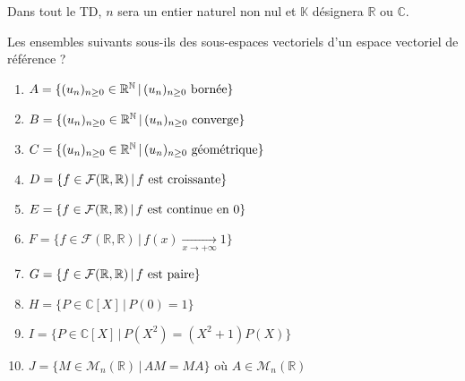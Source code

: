 \documentclass[a4paper,10pt]{report}
\begin{document}
\everymath{\displaystyle}


\begin{center}
\end{center}

\bigskip

\noindent Dans tout le TD, $n$ sera un entier naturel non nul et $\mathbb{K}$ désignera $\mathbb{R}$ ou $\mathbb{C}$.

\medskip


\begin{Exercice}{} Les ensembles suivants sous-ils des sous-espaces vectoriels d'un espace vectoriel de référence ?

\begin{multicols}{2}
\begin{small}
\begin{enumerate}
\item $A = \lbrace (u_n)_{n \geq 0} \in \mathbb{R}^{\mathbb{N}} \, \vert \, (u_n)_{n \geq 0} \hbox{ bornée} \rbrace $
\item $B = \lbrace (u_n)_{n \geq 0} \in \mathbb{R}^{\mathbb{N}} \, \vert \, (u_n)_{n \geq 0} \hbox{ converge} \rbrace $
\item $C = \lbrace (u_n)_{n \geq 0} \in \mathbb{R}^{\mathbb{N}} \, \vert \, (u_n)_{n \geq 0} \hbox{ géométrique} \rbrace $
\item $D = \lbrace f \in \mathcal{F}(\mathbb{R}, \mathbb{R}) \, \vert \, f \hbox{ est croissante} \rbrace$
\item $E = \lbrace f \in \mathcal{F}(\mathbb{R}, \mathbb{R}) \, \vert \, f \hbox{ est continue en 0} \rbrace$
\columnbreak
\item $F = \lbrace f \in \mathcal{F}(\mathbb{R}, \mathbb{R}) \, \vert \, f(x) \underset{ x \rightarrow + \infty}{\rightarrow} 1 \rbrace$
\item $G= \lbrace f \in \mathcal{F}(\mathbb{R}, \mathbb{R}) \, \vert \, f \hbox{ est paire} \rbrace$
\item $H= \lbrace P \in \mathbb{C}[X] \, \vert \, P(0)=1  \rbrace$
\item $I= \lbrace P \in \mathbb{C}[X] \, \vert \, P(X^2)=(X^2+1)P(X)  \rbrace$
\item $J= \lbrace M \in \mathcal{M}_n(\mathbb{R}) \, \vert \, AM=MA \rbrace$ où $A \in \mathcal{M}_n(\mathbb{R})$
\end{enumerate}
\end{small}
\end{multicols}
\end{Exercice}
\end{document}

